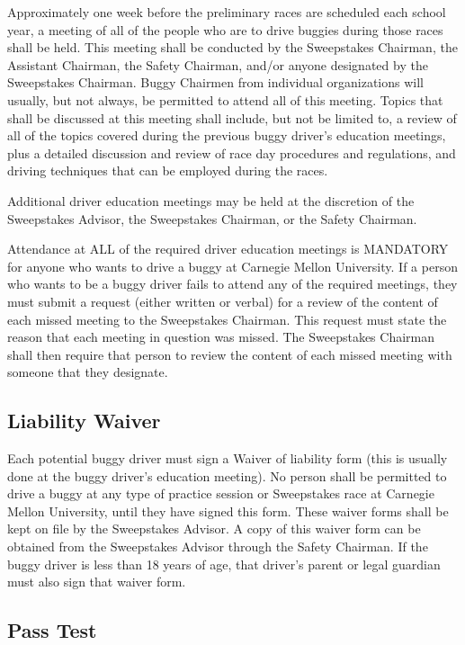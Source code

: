 	Approximately one week before the preliminary races are scheduled each school year, a meeting of all of the people who are to drive buggies during those races shall be held. This meeting shall be conducted by the Sweepstakes Chairman, the Assistant Chairman, the Safety Chairman, and/or anyone designated by the Sweepstakes Chairman. Buggy Chairmen from individual organizations will usually, but not always, be	permitted to attend all of this meeting. Topics that shall be discussed at this meeting shall include, but not be limited to, a review of all of the topics covered during the previous buggy driver's education meetings, plus a detailed discussion and review of race day procedures and regulations, and driving techniques that can be employed during the races.
	
	Additional driver education meetings may be held at the discretion of the Sweepstakes Advisor, the Sweepstakes Chairman, or the Safety Chairman.
	
	Attendance at ALL of the required driver education meetings is MANDATORY for anyone who wants to drive a buggy at Carnegie Mellon University. If a person who wants to be a buggy driver fails to attend any of the required meetings, they must submit a request (either written or verbal) for a review of the content of each missed meeting to the Sweepstakes Chairman. This request must state the reason that each meeting in question was missed. The Sweepstakes Chairman shall then require that person to review the content of each missed meeting with someone that they designate.

\subsection{Liability Waiver}

	Each potential buggy driver must sign a Waiver of liability form (this is usually done at the buggy driver's education meeting). No person shall be permitted to drive a buggy at any type of practice session or Sweepstakes race at Carnegie Mellon University, until they have signed this form. These waiver forms shall be kept on file by the Sweepstakes Advisor. A copy of this waiver form can be obtained from the Sweepstakes Advisor through the Safety Chairman. If the buggy driver is less than 18 years of age, that driver's parent or legal guardian must also sign that waiver form.

\subsection{Pass Test}

